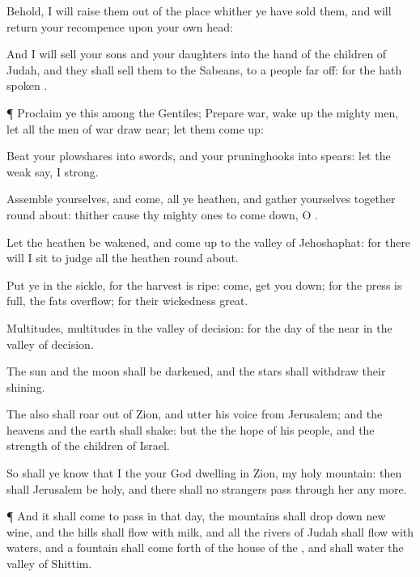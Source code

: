 {Behold, I will
raise them out of the
place whither ye have
sold them, and will
return your
recompence upon your own
head:

And I will
sell your
sons and your
daughters into the
hand of the
children of
Judah, and they shall
sell them to the
Sabeans, to a
people far
off: for the
{} hath
spoken
{}.


\par }{\PP {}¶
Proclaim ye this among the
Gentiles;
Prepare
war, wake
up the mighty
men, let all the
men of
war draw
near; let them come
up:

Beat your
plowshares into
swords, and your
pruninghooks into
spears: let the
weak
say, I
{}
strong.

Assemble yourselves, and
come, all ye
heathen, and gather yourselves
together round
about: thither cause thy mighty
ones to come
down, O
{}.

Let the
heathen be
wakened, and come
up to the
valley of
Jehoshaphat: for there will I
sit to
judge all the
heathen round
about.

Put ye in the
sickle, for the
harvest is
ripe:
come, get you
down; for the
press is
full, the
fats
overflow; for their
wickedness
{}
great.

Multitudes,
multitudes in the
valley of
decision: for the
day of the
{}
{}
near in the
valley of
decision.

The
sun and the
moon shall be
darkened, and the
stars shall
withdraw their
shining.

The
{} also shall
roar out of
Zion, and
utter his
voice from
Jerusalem; and the
heavens and the
earth shall
shake: but the
{}
{} the
hope of his
people, and the
strength of the
children of
Israel.

So shall ye
know that I
{} the
{} your
God
dwelling in
Zion, my
holy
mountain: then shall
Jerusalem be
holy, and there shall no
strangers pass
through her any more.


\par }{\PP {}¶ And it shall come to pass in that
day,
{} the
mountains shall drop
down new
wine, and the
hills shall
flow with
milk, and all the
rivers of
Judah shall
flow with
waters, and a
fountain shall come
forth of the
house of the
{}, and shall
water the
valley of
Shittim.

}
